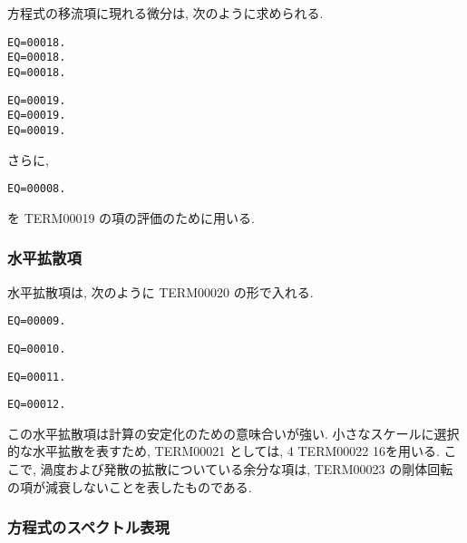 方程式の移流項に現れる微分は,
次のように求められる.
%
\begin{verbatim}
EQ=00018.
EQ=00018.
EQ=00018.
\end{verbatim}
%
\begin{verbatim}
EQ=00019.
EQ=00019.
EQ=00019.
\end{verbatim}
%
さらに,
\begin{verbatim}
EQ=00008.
\end{verbatim}
を TERM00019 の項の評価のために用いる.

\subsubsection{水平拡散項}

水平拡散項は, 次のように TERM00020 の形で入れる.
%
\begin{verbatim}
EQ=00009.
\end{verbatim}
%
\begin{verbatim}
EQ=00010.
\end{verbatim}
%
\begin{verbatim}
EQ=00011.
\end{verbatim}
%
\begin{verbatim}
EQ=00012.
\end{verbatim}
%
この水平拡散項は計算の安定化のための意味合いが強い.
小さなスケールに選択的な水平拡散を表すため,
TERM00021 としては, 4 TERM00022 16を用いる.
ここで, 渦度および発散の拡散についている余分な項は,
TERM00023 の剛体回転の項が減衰しないことを表したものである.

\subsubsection{方程式のスペクトル表現}


